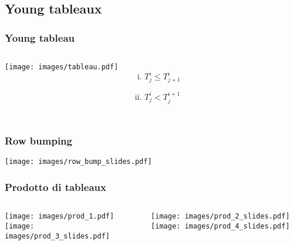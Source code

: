 \documentclass{beamer}
\begin{document}
\subsection{Young tableaux}

\begin{frame}
\frametitle{Young tableau}
\begin{columns}
\column{5cm}
\texttt{[image: images/tableau.pdf]}
\column{5cm}
\begin{enumerate}[(i)]
\item $T^i_j \leq T^i_{j+1}$
\item $T^i_j < T^{i+1}_j$
\end{enumerate}
\end{columns}
\end{frame}

\begin{frame}
\frametitle{Row bumping}
\centering
\texttt{[image: images/row\_bump\_slides.pdf]}
\end{frame}

\begin{frame}
\frametitle{Prodotto di tableaux}
\centering
\begin{columns}[t]
\begin{column}{5cm}
\texttt{[image: images/prod\_1.pdf]}
\vspace{1cm}
\texttt{[image: images/prod\_3\_slides.pdf]}
\end{column}
\begin{column}{5cm}
\texttt{[image: images/prod\_2\_slides.pdf]}
\vspace{1cm}
\texttt{[image: images/prod\_4\_slides.pdf]}
\end{column}
\end{columns}
\end{frame}
\end{document}
